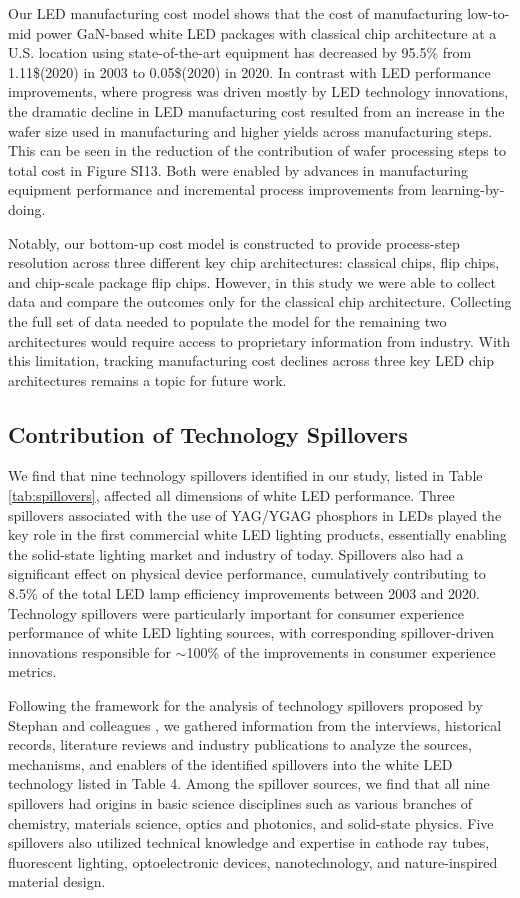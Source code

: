 \documentclass[journal=jacsat,manuscript=article]{achemso}
\begin{document}
Our LED manufacturing cost model shows that the cost of manufacturing low-to-mid power GaN-based white LED packages with classical chip architecture at a U.S. location using state-of-the-art equipment has decreased by 95.5\% from 1.11\$(2020) in 2003 to 0.05\$(2020) in 2020. In contrast with LED performance improvements, where progress was driven mostly by LED technology innovations, the dramatic decline in LED manufacturing cost resulted from an increase in the wafer size used in manufacturing and higher yields across manufacturing steps. This can be seen in the reduction of the contribution of wafer processing steps to  total cost in Figure SI13. Both were enabled by advances in manufacturing equipment performance and incremental process improvements from learning-by-doing.

Notably, our bottom-up cost model is constructed to provide process-step resolution across three different key chip architectures: classical chips, flip chips, and chip-scale package flip chips. However, in this study we were able to collect data and compare the outcomes only for the classical chip architecture. Collecting the full set of data needed to populate the model for the remaining two architectures would require access to proprietary information from industry. With this limitation, tracking manufacturing cost declines across three key LED chip architectures remains a topic for future work.

\subsection{Contribution of Technology Spillovers}
\label{subsec:spillovers}

We find that nine technology spillovers identified in our study, listed in Table \ref{tab:spillovers}, affected all dimensions of white LED performance. Three spillovers associated with the use of YAG/YGAG phosphors in LEDs played the key role in the first commercial white LED lighting products, essentially enabling the solid-state lighting market and industry of today. Spillovers also had a significant effect on physical device performance, cumulatively contributing to 8.5\% of the total LED lamp efficiency improvements between 2003 and 2020. Technology spillovers were particularly important for consumer experience performance of white LED lighting sources, with corresponding spillover-driven innovations responsible for $\sim$100\% of the improvements in consumer experience metrics. 

Following the framework for the analysis of technology spillovers proposed by Stephan and colleagues \cite{Stephan2021}, we gathered information from the interviews, historical records, literature reviews and industry publications to analyze the sources, mechanisms, and enablers of the identified spillovers into the white LED technology listed in Table 4. Among the spillover sources, we find that all nine spillovers had origins in basic science disciplines such as various branches of chemistry, materials science, optics and photonics, and solid-state physics. Five spillovers also utilized technical knowledge and expertise in cathode ray tubes, fluorescent lighting, optoelectronic devices, nanotechnology, and nature-inspired material design. 
\end{document}
